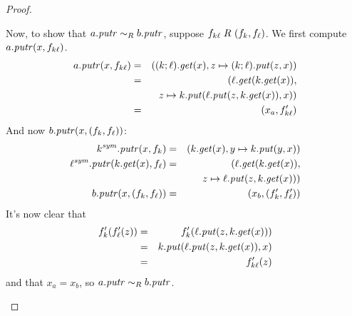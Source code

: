 \begin{defn}[$R$-similarity]
\begin{theorem}
\begin{lemma}
\begin{theorem}[No products]
\begin{lemma}
\begin{defn}
\begin{theorem}
\begin{corollary}[Hylomorphism]
\begin{defn}
\begin{defn}[Symmetrization]
\begin{proof}
\begin{longenum}
Now, to show that $a.\mathit{putr} \sim_R b.\mathit{putr}$, suppose
$f_{k\ell}\mathrel{R_{}}(f_k,f_\ell)$. We first compute $a.\mathit{putr}(x,f_{k\ell})$.
\begin{eqnarray*}
    a.\mathit{putr}(x,f_{k\ell}) &=& ((k;\ell).\mathit{get}(x),z \mapsto (k;\ell).\mathit{put}(z,x)) \\
    &=& (\ell.\mathit{get}(k.\mathit{get}(x)), \\
    & & z \mapsto k.\mathit{put}(\ell.\mathit{put}(z,k.\mathit{get}(x)),x)) \\
    &=& (x_a,f_{k\ell}')
\end{eqnarray*}
And now $b.\mathit{putr}(x,(f_k,f_\ell))$:
\begin{eqnarray*}
    k^\mathit{sym}.\mathit{putr}(x,f_k) &=& (k.\mathit{get}(x),y \mapsto k.\mathit{put}(y,x)) \\
    \ell^\mathit{sym}.\mathit{putr}(k.\mathit{get}(x),f_\ell) &=& (\ell.\mathit{get}(k.\mathit{get}(x)), \\
    & & z \mapsto \ell.\mathit{put}(z,k.\mathit{get}(x))) \\
    b.\mathit{putr}(x,(f_k,f_\ell)) &=& (x_b,(f_k',f_\ell'))
\end{eqnarray*}
It's now clear that
\begin{eqnarray*}
    f_k'(f_\ell'(z)) &=& f_k'(\ell.\mathit{put}(z,k.\mathit{get}(x))) \\
    &=& k.\mathit{put}(\ell.\mathit{put}(z,k.\mathit{get}(x)),x) \\
    &=& f_{k\ell}'(z)
\end{eqnarray*}
and that $x_a=x_b$, so $a.\mathit{putr} \sim_R b.\mathit{putr}$.


\end{longenum}
\end{proof}
\end{defn}
\end{defn}
\end{corollary}
\end{theorem}
\end{defn}
\end{lemma}
\end{theorem}
\end{lemma}
\end{theorem}
\end{defn}
